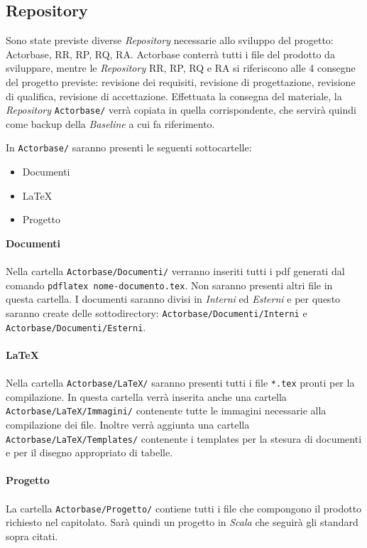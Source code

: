 \documentclass[a4paper]{report}
\begin{document}
	\subsection{Repository}
	Sono state previste diverse \emph{Repository} necessarie allo sviluppo del progetto: Actorbase, RR, RP, RQ, RA. 
	Actorbase conterrà tutti i file del prodotto da sviluppare, mentre le \emph{Repository} RR, RP, RQ e RA si riferiscono 
	alle 4 consegne del progetto previste: revisione dei requisiti, revisione di progettazione, revisione di qualifica, 
	revisione di accettazione. Effettuata la consegna del materiale, la \emph{Repository} \verb|Actorbase/| verrà copiata 
	in quella corrispondente, che servirà quindi come backup della \emph{Baseline} a cui fa riferimento.
	
	In \verb|Actorbase/| saranno presenti le seguenti sottocartelle:
	\begin{itemize}
		\item Documenti
		\item LaTeX
		\item Progetto
	\end{itemize}
	\textbf{Documenti} \\ \\
	Nella cartella \verb|Actorbase/Documenti/| verranno inseriti tutti i pdf generati dal comando \verb|pdflatex nome-documento.tex|. Non 
	saranno presenti altri file in questa cartella. I documenti saranno divisi in \emph{Interni} ed \emph{Esterni} e per questo saranno create
	delle sottodirectory: \verb|Actorbase/Documenti/Interni| e\\  \verb|Actorbase/Documenti/Esterni|. \\ \\
	\textbf{LaTeX} \\ \\
	Nella cartella \verb|Actorbase/LaTeX/| saranno presenti tutti i file \verb|*.tex| pronti per la compilazione. In questa cartella verrà inserita
	anche una cartella\\ \verb|Actorbase/LaTeX/Immagini/| contenente tutte le immagini necessarie alla compilazione dei file.
	Inoltre verrà aggiunta una cartella \verb|Actorbase/LaTeX/Templates/| contenente i templates per la stesura di documenti e per il
	disegno appropriato di tabelle. \\ \\
	\textbf{Progetto} \\ \\
	La cartella \verb|Actorbase/Progetto/| contiene tutti i file che compongono il prodotto richiesto nel capitolato. Sarà quindi un progetto in
	\emph{Scala} che seguirà gli standard sopra citati.
\end{document}
